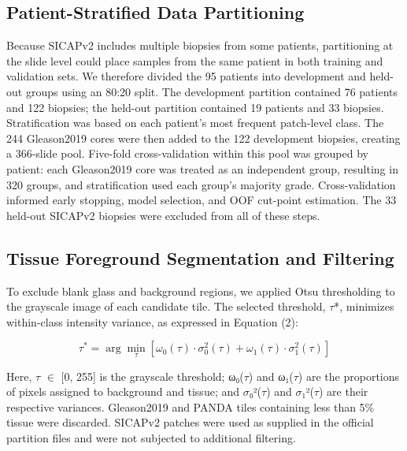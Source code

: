 \documentclass[11pt,a4paper]{article}
\begin{document}
\subsection{Patient-Stratified Data Partitioning}
Because SICAPv2 includes multiple biopsies from some patients, partitioning at the slide level could place samples from the same patient in both training and validation sets. We therefore divided the 95 patients into development and held-out groups using an 80:20 split. The development partition contained 76 patients and 122 biopsies; the held-out partition contained 19 patients and 33 biopsies. Stratification was based on each patient's most frequent patch-level class. The 244 Gleason2019 cores were then added to the 122 development biopsies, creating a 366-slide pool. Five-fold cross-validation within this pool was grouped by patient: each Gleason2019 core was treated as an independent group, resulting in 320 groups, and stratification used each group's majority grade. Cross-validation informed early stopping, model selection, and OOF cut-point estimation. The 33 held-out SICAPv2 biopsies were excluded from all of these steps.


\subsection{Tissue Foreground Segmentation and Filtering}
To exclude blank glass and background regions, we applied Otsu thresholding \cite{ref21} to the grayscale image of each candidate tile. The selected threshold, $\tau$*, minimizes within-class intensity variance, as expressed in Equation (2):


\begin{equation}
\tau^* = \arg\min_\tau \left[ \omega_0(\tau) \cdot \sigma_0^2(\tau) + \omega_1(\tau) \cdot \sigma_1^2(\tau) \right]
\label{eq:otsu}
\end{equation}

Here, $\tau$ $\in$ [0, 255] is the grayscale threshold; ω₀($\tau$) and ω₁($\tau$) are the proportions of pixels assigned to background and tissue; and $\sigma$₀²($\tau$) and $\sigma$₁²($\tau$) are their respective variances. Gleason2019 and PANDA tiles containing less than 5\% tissue were discarded. SICAPv2 patches were used as supplied in the official partition files and were not subjected to additional filtering.
\end{document}
